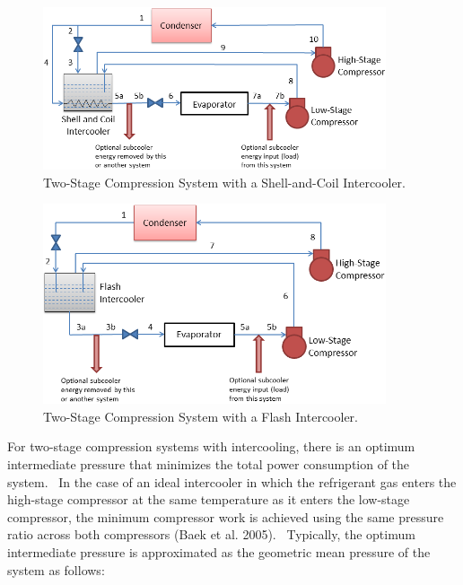 \begin{figure}[hbtp] %
\centering
\includegraphics[width=0.9\textwidth, height=0.9\textheight, keepaspectratio=true]{media/image6278.png}
\caption{Two-Stage Compression System with a Shell-and-Coil Intercooler. \protect \label{fig:two-stage-compression-system-with-a-shell}}
\end{figure}

\begin{figure}[hbtp] %
\centering
\includegraphics[width=0.9\textwidth, height=0.9\textheight, keepaspectratio=true]{media/image6279.png}
\caption{Two-Stage Compression System with a Flash Intercooler. \protect \label{fig:two-stage-compression-system-with-a-flash}}
\end{figure}

For two-stage compression systems with intercooling, there is an optimum intermediate pressure that minimizes the total power consumption of the system.~ In the case of an ideal intercooler in which the refrigerant gas enters the high-stage compressor at the same temperature as it enters the low-stage compressor, the minimum compressor work is achieved using the same pressure ratio across both compressors (Baek et al. 2005).~ Typically, the optimum intermediate pressure is approximated as the geometric mean pressure of the system as follows:

